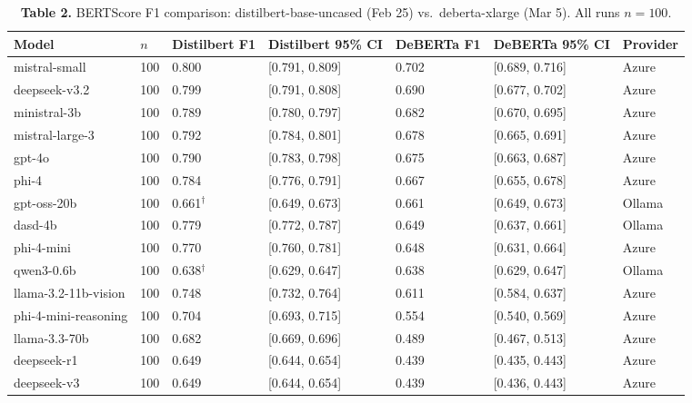 \documentclass[11pt,letterpaper]{article}
\begin{document}
\vspace{0.2cm}

\begin{table}[h!]
\centering
\caption*{\textbf{Table 2.} BERTScore F1 comparison: distilbert-base-uncased (Feb 25) vs.\ deberta-xlarge (Mar 5). All runs $n=100$.}
\begin{tabular}{l R{0.7cm} R{1.5cm} R{2.6cm} R{1.5cm} R{2.6cm} l}
\toprule
\textbf{Model} & \textbf{$n$} & \textbf{Distilbert F1} & \textbf{Distilbert 95\% CI} & \textbf{DeBERTa F1} & \textbf{DeBERTa 95\% CI} & \textbf{Provider} \\
\midrule
{} mistral-small        & 100 & 0.800 & [0.791, 0.809] & 0.702 & [0.689, 0.716] & Azure \\
 deepseek-v3.2        & 100 & 0.799 & [0.791, 0.808] & 0.690 & [0.677, 0.702] & Azure \\
 ministral-3b         & 100 & 0.789 & [0.780, 0.797] & 0.682 & [0.670, 0.695] & Azure \\
 mistral-large-3      & 100 & 0.792 & [0.784, 0.801] & 0.678 & [0.665, 0.691] & Azure \\
 gpt-4o               & 100 & 0.790 & [0.783, 0.798] & 0.675 & [0.663, 0.687] & Azure \\
phi-4                & 100 & 0.784 & [0.776, 0.791] & 0.667 & [0.655, 0.678] & Azure \\
gpt-oss-20b          & 100 & 0.661$^{\dagger}$ & [0.649, 0.673] & 0.661 & [0.649, 0.673] & Ollama \\
dasd-4b              & 100 & 0.779 & [0.772, 0.787] & 0.649 & [0.637, 0.661] & Ollama \\
phi-4-mini           & 100 & 0.770 & [0.760, 0.781] & 0.648 & [0.631, 0.664] & Azure \\
qwen3-0.6b           & 100 & 0.638$^{\dagger}$ & [0.629, 0.647] & 0.638 & [0.629, 0.647] & Ollama \\
llama-3.2-11b-vision & 100 & 0.748 & [0.732, 0.764] & 0.611 & [0.584, 0.637] & Azure \\
phi-4-mini-reasoning & 100 & 0.704 & [0.693, 0.715] & 0.554 & [0.540, 0.569] & Azure \\
llama-3.3-70b        & 100 & 0.682 & [0.669, 0.696] & 0.489 & [0.467, 0.513] & Azure \\
 deepseek-r1          & 100 & 0.649 & [0.644, 0.654] & 0.439 & [0.435, 0.443] & Azure \\
 deepseek-v3          & 100 & 0.649 & [0.644, 0.654] & 0.439 & [0.436, 0.443] & Azure \\

\end{tabular}
\end{table}
\end{document}
